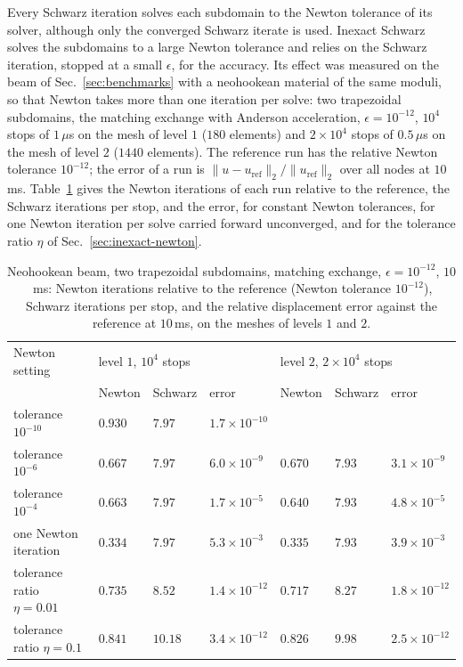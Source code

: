 \documentclass[11pt]{article}
\begin{document}
Every Schwarz iteration solves each subdomain to the Newton tolerance of
its solver, although only the converged Schwarz iterate is used. Inexact
Schwarz solves the subdomains to a large Newton tolerance and relies on
the Schwarz iteration, stopped at a small $\epsilon$, for the accuracy. Its effect was measured on
the beam of Sec.~\ref{sec:benchmarks} with a neohookean material of the
same moduli, so that Newton takes more than one iteration per solve: two
trapezoidal subdomains, the matching exchange with Anderson
acceleration, $\epsilon = 10^{-12}$, $10^4$ stops of $1\,\mu$s on the
mesh of level $1$ ($180$ elements) and $2\times 10^4$ stops of
$0.5\,\mu$s on the mesh of level $2$ ($1440$ elements). The reference
run has the relative Newton tolerance $10^{-12}$; the error of a run is
$\lVert u - u_{\mathrm{ref}} \rVert_2 / \lVert u_{\mathrm{ref}} \rVert_2$
over all nodes at $10$\,ms. Table~\ref{tab:inexact} gives the Newton
iterations of each run relative to the reference, the Schwarz iterations per
stop, and the error, for constant Newton tolerances, for one Newton
iteration per solve carried forward unconverged, and for the tolerance
ratio $\eta$ of Sec.~\ref{sec:inexact-newton}.

\begin{table}[htbp]
\centering
\caption{Neohookean beam, two trapezoidal subdomains, matching exchange,
$\epsilon = 10^{-12}$, $10$\,ms: Newton iterations relative to the
reference (Newton tolerance $10^{-12}$), Schwarz iterations per stop, and
the relative displacement error against the reference at $10$\,ms, on the
meshes of levels $1$ and $2$.}
\label{tab:inexact}
\begin{tabular}{lllllll}
\hline
Newton setting & \multicolumn{3}{l}{level $1$, $10^4$ stops}
  & \multicolumn{3}{l}{level $2$, $2\times 10^4$ stops} \\
 & Newton & Schwarz & error & Newton & Schwarz & error \\
\hline
tolerance $10^{-10}$ & $0.930$ & $7.97$ & $1.7\times 10^{-10}$ & & & \\
tolerance $10^{-6}$ & $0.667$ & $7.97$ & $6.0\times 10^{-9}$
  & $0.670$ & $7.93$ & $3.1\times 10^{-9}$ \\
tolerance $10^{-4}$ & $0.663$ & $7.97$ & $1.7\times 10^{-5}$
  & $0.640$ & $7.93$ & $4.8\times 10^{-5}$ \\
one Newton iteration & $0.334$ & $7.97$ & $5.3\times 10^{-3}$
  & $0.335$ & $7.93$ & $3.9\times 10^{-3}$ \\
tolerance ratio $\eta = 0.01$ & $0.735$ & $8.52$ & $1.4\times 10^{-12}$
  & $0.717$ & $8.27$ & $1.8\times 10^{-12}$ \\
tolerance ratio $\eta = 0.1$ & $0.841$ & $10.18$ & $3.4\times 10^{-12}$
  & $0.826$ & $9.98$ & $2.5\times 10^{-12}$ \\
\hline
\end{tabular}
\end{table}
\end{document}
